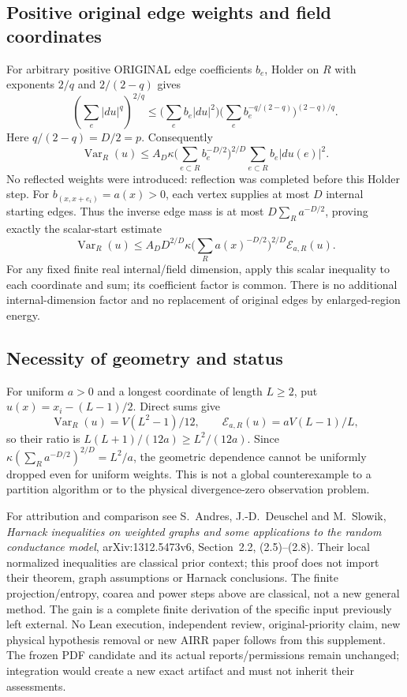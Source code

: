 \subsection{Positive original edge weights and field coordinates}
For arbitrary positive ORIGINAL edge coefficients $b_e$, Holder on $R$
with exponents $2/q$ and $2/(2-q)$ gives
\[
 \left(\sum_e|du|^q\right)^{2/q}
 \leq\Big(\sum_e b_e|du|^2\Big)
 \Big(\sum_e b_e^{-q/(2-q)}\Big)^{(2-q)/q}.
\]
Here $q/(2-q)=D/2=p$. Consequently
\begin{equation}\label{eq:rectangle-weighted-derived}
 \operatorname{Var}_R(u)\leq A_D\kappa
 \Big(\sum_{e\subset R}b_e^{-D/2}\Big)^{2/D}
 \sum_{e\subset R}b_e|du(e)|^2.
\end{equation}
No reflected weights were introduced: reflection was completed before
this Holder step. For $b_{(x,x+e_i)}=a(x)>0$, each vertex supplies at most
$D$ internal starting edges. Thus the inverse edge mass is at most
$D\sum_Ra^{-D/2}$, proving exactly the scalar-start estimate
\[
 \operatorname{Var}_R(u)\leq A_D D^{2/D}\kappa
 \Big(\sum_Ra(x)^{-D/2}\Big)^{2/D}\mathcal E_{a,R}(u).
\]
For any fixed finite real internal/field dimension, apply this scalar
inequality to each coordinate and sum; its coefficient factor is common.
There is no additional internal-dimension factor and no replacement of
original edges by enlarged-region energy.

\subsection{Necessity of geometry and status}
For uniform $a>0$ and a longest coordinate of length $L\geq2$, put
$u(x)=x_i-(L-1)/2$. Direct sums give
\[
 \operatorname{Var}_R(u)=V(L^2-1)/12,\qquad
 \mathcal E_{a,R}(u)=aV(L-1)/L,
\]
so their ratio is $L(L+1)/(12a)\geq L^2/(12a)$. Since
$\kappa(\sum_Ra^{-D/2})^{2/D}=L^2/a$, the geometric dependence cannot
be uniformly dropped even for uniform weights. This is not a global
counterexample to a partition algorithm or to the physical divergence-zero
observation problem.

For attribution and comparison see S.~Andres, J.-D.~Deuschel and M.~Slowik,
\emph{Harnack inequalities on weighted graphs and some applications to the
random conductance model}, arXiv:1312.5473v6, Section~2.2, (2.5)--(2.8).
Their local normalized inequalities are classical prior context; this
proof does not import their theorem, graph assumptions or Harnack conclusions.
The finite projection/entropy, coarea and power steps above are classical,
not a new general method. The gain is a complete finite derivation of the
specific input previously left external. No Lean execution, independent
review, original-priority claim, new physical hypothesis removal or new
AIRR paper follows from this supplement. The frozen PDF candidate and its
actual reports/permissions remain unchanged; integration would create a
new exact artifact and must not inherit their assessments.
